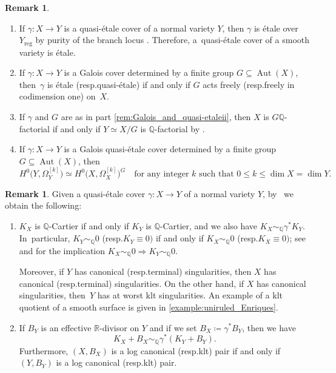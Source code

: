 \documentclass[10pt]{amsart}
\newcommand{\resp}{resp.}
\newcommand{\skpt}{\par\smallskip\noindent}
\theoremstyle{plain}
\theoremstyle{definition}
\newtheorem{rem}[thm]{Remark}
\newcommand{\Q}{\mathbb{Q}}
\newcommand{\R}{\mathbb{R}}
\DeclareMathOperator{\Aut}{Aut}
\begin{document}
\skpt
\begin{rem}
\label{rem:Galois_and_quasi-etale}
\begin{enumerate}
\item\label{rem:Galois_and_quasi-etalei}
If $\gamma \colon X \to Y$ is a quasi-étale cover of a normal variety $Y$, then $\gamma$ is étale over $Y_\text{reg}$ by purity of the branch locus \cite[Tag 0BMB]{Stacks}. Therefore, a~quasi-étale cover of a smooth variety is étale.

\item\label{rem:Galois_and_quasi-etaleii}
If $\gamma \colon X \to Y$ is a Galois cover determined by a finite group $G \subseteq \Aut(X)$, then~$\gamma$ is étale (\resp quasi-étale) if and only if $G$ acts freely (\resp freely in codimension one) on~$X$.

\item\label{rem:Galois_and_quasi-etaleiii}
If $\gamma$ and $G$ are as in part \eqref{rem:Galois_and_quasi-etaleii}, then $X$ is $G\Q$-factorial if and only if $Y \simeq X /G$ is $\Q$\nobreakdash-factorial by \cite[Lem.\,1.1.3]{Pro21}.

\item\label{rem:Galois_and_quasi-etaleiv}
If $\gamma \colon X \to Y$ is a Galois quasi-étale cover determined by a finite group $G \subseteq \Aut(X)$, then
\[
H^0 \bigl(Y,\Omega_Y^{[k]} \bigr) \simeq H^0 \bigl(X,\Omega_X^{[k]} \bigr)^G \quad \text{for any integer $k$ such that } 0 \leq k \leq \dim X = \dim Y.
\]
\end{enumerate}
\end{rem}

\begin{rem}
\label{rem:singularities_quasi-etale_cover}
Given a quasi-étale cover $\gamma \colon X \to Y$ of a normal variety $Y$, by~\cite[Prop.\,5.20]{KM98} we obtain the following:
\begin{enumerate}
\item\label{rem:singularities_quasi-etale_coveri}
$K_X$ is $\Q$\nobreakdash-Cartier if and only if $K_Y$ is $\Q$\nobreakdash-Cartier, and we also have $K_X \sim_\Q \gamma^* K_Y$. In~particular, $K_Y \sim_\Q 0$ (\resp $K_Y \equiv 0)$ if and only if $K_X \sim_\Q 0$ (\resp $K_X \equiv 0)$; see \cite[Ch.\,7, Th.\,2.18]{Liu02book} and \cite[Tag 02RT]{Stacks} for the implication \hbox{$K_X \!\sim_\Q\! 0 \!\Rightarrow\! K_Y \!\sim_\Q\! 0$}.

Moreover, if $Y$ has canonical (\resp terminal) singularities, then $X$ has canonical (\resp terminal) singularities. On the other hand, if $X$ has canonical singularities, then~$Y$ has at worst klt singularities. An example of a klt quotient of a smooth surface is given in \autoref{example:uniruled_Enriques}.

\item\label{rem:singularities_quasi-etale_coverii}
If $B_Y$ is an effective $\R$\nobreakdash-divisor on $Y$ and if we set $B_X \coloneqq \gamma^* B_Y$, then we have
\[
K_X + B_X \sim_\Q \gamma^* (K_Y + B_Y).
\]
Furthermore, $(X,B_X)$ is a log canonical (\resp klt) pair if and only if $(Y,B_Y)$ is a log canonical (\resp klt) pair.
\end{enumerate}
\end{rem}
\end{document}

